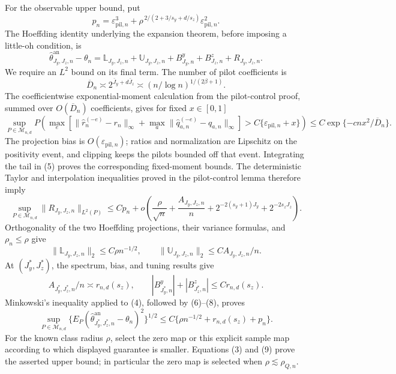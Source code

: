 For the observable upper bound, put
\[
p_n=\varepsilon_{\mathrm{pil},n}^3
+\rho^{\,2/(2+3/s_y+d/s_z)}\varepsilon_{\mathrm{pil},n}^2.
\]
The Hoeffding identity underlying the expansion theorem, before imposing a little-oh condition, is
\[
\widehat\theta^{\mathrm{an}}_{J_y,J_z,n}-\theta_n
=\mathbb L_{J_y,J_z,n}+\mathbb U_{J_y,J_z,n}
+B^y_{J_y,n}+B^z_{J_z,n}+R_{J_y,J_z,n}.                                  \tag{4}
\]
We require an \(L^2\) bound on its final term.  The number of pilot coefficients is
\[
\overline D_n\asymp2^{\bar J_y+d\bar J_z}
\asymp(n/\log n)^{1/(2\beta+1)}.
\]
The coefficientwise exponential-moment calculation from the pilot-control proof, summed over \(O(\overline D_n)\) coefficients, gives for fixed \(x\in[0,1]\)
\[
\sup_{P\in\mathcal M_{n,d}}
P\!\left(\max_e\left[\|\widehat r_n^{(-e)}-r_n\|_\infty
+\max_a\|\widehat q_{a,n}^{(-e)}-q_{a,n}\|_\infty\right]
>C\{\varepsilon_{\mathrm{pil},n}+x\}\right)
\le C\exp\{-cnx^2/\overline D_n\}.                                      \tag{5}
\]
The projection bias is \(O(\varepsilon_{\mathrm{pil},n})\); ratios and normalization are Lipschitz on the positivity event, and clipping keeps the pilots bounded off that event.  Integrating the tail in (5) proves the corresponding fixed-moment bounds.  The deterministic Taylor and interpolation inequalities proved in the pilot-control lemma therefore imply
\[
\sup_{P\in\mathcal M_{n,d}}\|R_{J_y,J_z,n}\|_{L^2(P)}
\le Cp_n+o\!\left(\frac\rho{\sqrt n}+\frac{A_{J_y,J_z,n}}n
+2^{-2(s_y+1)J_y}+2^{-2s_zJ_z}\right).                                   \tag{6}
\]
Orthogonality of the two Hoeffding projections, their variance formulas, and \(\rho_n\le\rho\) give
\[
\|\mathbb L_{J_y,J_z,n}\|_2\le C\rho n^{-1/2},
\qquad
\|\mathbb U_{J_y,J_z,n}\|_2\le C A_{J_y,J_z,n}/n.                       \tag{7}
\]
At \((J_y^*,J_z^*)\), the spectrum, bias, and tuning results give
\[
A_{J_y^*,J_z^*,n}/n\asymp r_{n,d}(s_z),
\qquad
|B^y_{J_y^*,n}|+|B^z_{J_z^*,n}|\le Cr_{n,d}(s_z).                         \tag{8}
\]
Minkowski's inequality applied to (4), followed by (6)--(8), proves
\[
\sup_{P\in\mathcal M_{n,d}}
\{E_P(\widehat\theta^{\mathrm{an}}_{J_y^*,J_z^*,n}-\theta_n)^2\}^{1/2}
\le C\{\rho n^{-1/2}+r_{n,d}(s_z)+p_n\}.                                \tag{9}
\]
For the known class radius \(\rho\), select the zero map or this explicit sample map according to which displayed guarantee is smaller.  Equations (3) and (9) prove the asserted upper bound; in particular the zero map is selected when \(\rho\lesssim\rho_{Q,n}\).

